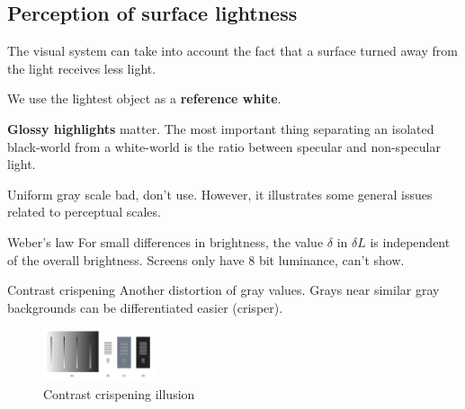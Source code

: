 \begin{mdframed}
\subsection{Perception of surface lightness}
\begin{multicols}{2}
    The visual system can take into account the fact that a surface turned
    away from the light receives less light.



    We use the lightest object as a \textbf{reference white}.


    \textbf{Glossy highlights} matter. The most important thing separating an isolated
    black-world from a white-world is the ratio between specular and
    non-specular light.
\begin{compactdesc}
    \item[Uniform gray scale] bad, don't use. However, it illustrates some general
        issues related to perceptual scales.
    \item[Weber's law] For small differences in brightness, the value $\delta$
        in $\delta L$ is independent of the overall brightness. Screens
        only have 8 bit luminance, can't show.
    \item[Contrast crispening] Another distortion of gray values. Grays near
        similar gray backgrounds can be differentiated easier (crisper).

\end{compactdesc}
    \begin{figure}[H]
        \centering
        \includegraphics[width=0.3\textwidth]{contrast_crispening.png}
        \caption{Contrast crispening illusion}
    \end{figure}


\end{multicols}\end{mdframed}

